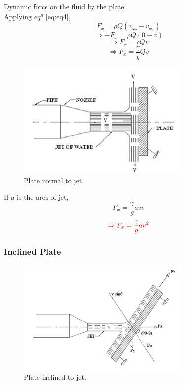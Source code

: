 \documentclass{article}
\begin{document}
Dynamic force on the fluid by the plate:
\\
Applying $eq^n$ \ref{eq:eq4}, 
$$F_x = \rho Q (v_{x_{2}} - v_{x_{1}}) $$
$$\Rightarrow -F_x = \rho Q (0-v)$$
\begin{equation}
	\Rightarrow F_x = \rho Q v \label{eq:eq5}
\end{equation}
\begin{equation}
	\Rightarrow F_x = \frac{\gamma}{g} Q v \label{eq:eq6}
\end{equation}

\begin{figure}[H]
  \centering
  \includegraphics[width=0.75\textwidth]{img/flat_plate.png}
  \caption{Plate normal to jet.}
  \label{fig:Plate normal to jet}
\end{figure}

If $a$ is the area of jet,
$$F_x = \frac{\gamma}{g} a v  v$$
\begin{equation}
	\textcolor{red}{\Rightarrow F_x = \frac{\gamma}{g} a v^2} \label{eq:eq7}
\end{equation}

\subsubsection{Inclined Plate}
\begin{figure}[H]
  \centering
  \includegraphics[width=0.75\textwidth]{img/inclined_plate.png}
  \caption{Plate inclined to jet.}
  \label{fig:Plate inclined to jet}
\end{figure}
\vspace{0.25cm}
\end{document}
